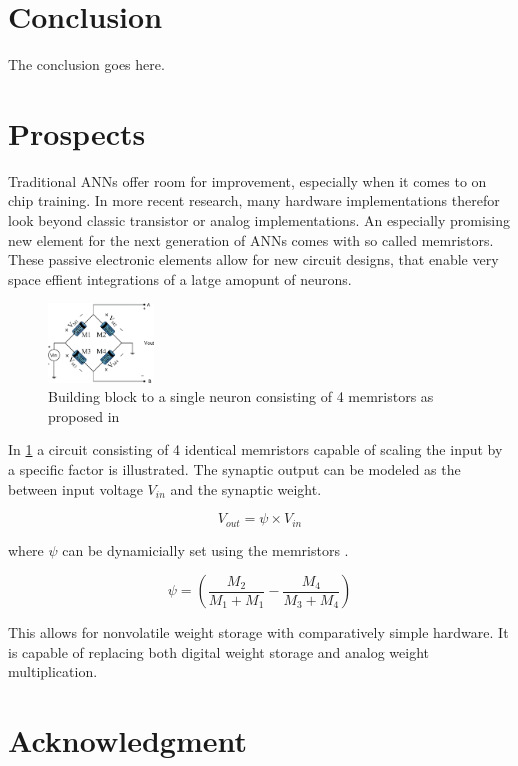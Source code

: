\documentclass[conference]{IEEEtran}
\begin{document}
    \section{Conclusion}
    The conclusion goes here.

    \section*{Prospects}

    Traditional ANNs offer room for improvement, especially when it comes to on chip training.
    In more recent research, many hardware implementations therefor look beyond classic transistor or analog implementations.
    An especially promising new element for the next generation of ANNs comes with so called memristors.
    These passive electronic elements allow for new circuit designs, that enable very space effient integrations of a latge amopunt of neurons.

    \begin{figure}[h]
        \centering
        \includegraphics[width=0.25\textwidth]{resources/memristor.png}
        \caption{Building block to a single neuron consisting of 4 memristors as proposed in \cite[Fig.~1]{adhikari2012memristor}}
        \label{fig:memristor}
    \end{figure}

    In \ref{fig:memristor} a circuit consisting of 4 identical memristors capable of scaling the input by a specific factor is illustrated.
    The synaptic output can be modeled as the between input voltage $V_{in}$ and the synaptic weight.

    \[V_{out} = \psi \times V_{in}\]

    where $\psi$ can be dynamicially set using the memristors \cite{adhikari2012memristor}.

    \[\psi = \left(\frac{M_2}{M_1+M_1} - \frac{M_4}{M_3+M_4}\right)\]

    This allows for nonvolatile weight storage with comparatively simple hardware.
    It is capable of replacing both digital weight storage and analog weight multiplication.
    

    \section*{Acknowledgment}



    \medskip

    
    
\end{document}
